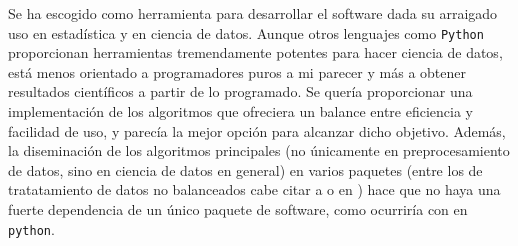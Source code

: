 Se ha escogido \R como herramienta para desarrollar el software dada su arraigado uso en estadística y en ciencia
de datos. Aunque otros lenguajes como \texttt{Python} proporcionan herramientas tremendamente potentes para
hacer ciencia de datos, \R está menos orientado a programadores puros a mi parecer y más a obtener resultados
científicos a partir de lo programado. Se quería proporcionar una implementación de los algoritmos que 
ofreciera un balance entre eficiencia y facilidad de uso, y \R parecía la mejor opción para alcanzar dicho
objetivo. Además, la diseminación de los algoritmos principales (no únicamente en preprocesamiento de datos,
sino en ciencia de datos en general) en varios paquetes (entre los de tratatamiento de datos no balanceados cabe
citar a  o  en \R) hace que no haya una fuerte dependencia de un 
único paquete de software, como ocurriría con  en \texttt{python}.

  